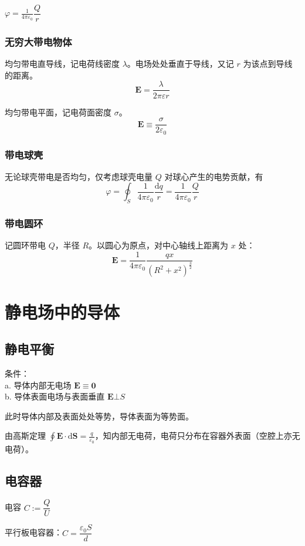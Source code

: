 \documentclass[12pt, a4paper, UTF8, openany]{ctexbook}
\newcommand{\dif}{\mathrm{d}}
\newcommand{\vect}[1]{\mathbf{#1}}
\newcommand{\vecs}{\vect{S}}
\newcommand{\vece}{\vect{E}}
\newcommand{\eps}{\varepsilon}
\newcommand{\conste}{\frac{1}{4 \pi \varepsilon_0}}
\begin{document}
        $\varphi = \conste \dfrac{Q}{r}$

        \subsubsection{无穷大带电物体}
        均匀带电直导线，记电荷线密度 $\lambda$。电场处处垂直于导线，又记 $r$ 为该点到导线的距离。
        $$\vece = \frac{\lambda}{2 \pi \varepsilon r}$$

        均匀带电平面，记电荷面密度 $\sigma$。
        $$\vece \equiv \frac{\sigma}{2\varepsilon_0}$$

        \subsubsection{带电球壳}
        无论球壳带电是否均匀，仅考虑球壳电量 $Q$ 对球心产生的电势贡献，有
        $$\varphi = \oint_{S} \conste \frac{\dif q}{r} = \conste \frac{Q}{r}$$

        \subsubsection{带电圆环}
        记圆环带电 $Q$，半径 $R$。以圆心为原点，对中心轴线上距离为 $x$ 处：
        $$\vece = \conste \frac{q x}{(R^2 + x^2)^{\frac{3}{2}}}$$

    \section{静电场中的导体}
        \subsection{静电平衡}
        条件：\\
        a. 导体内部无电场 $\vece \equiv \vect{0}$ \\
        b. 导体表面电场与表面垂直 $\vece \bot S$

        此时导体内部及表面处处等势，导体表面为等势面。

        由高斯定理 $\oint \vece \cdot \dif \vecs = \frac{q}{\varepsilon_0}$，知内部无电荷，电荷只分布在容器外表面（空腔上亦无电荷）。

        \subsection{电容器}
        电容 $C := \dfrac{Q}{U}$

        平行板电容器：$C = \dfrac{\eps_0 S}{d}$
        
\end{document}
